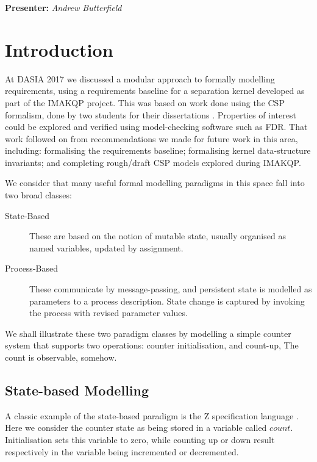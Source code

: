 
\begin{center}
\textbf{Presenter:} \emph{Andrew Butterfield}
\end{center}

\section{Introduction}

At DASIA 2017\cite{Lero-DASIA17}
we discussed a modular approach to formally modelling
requirements, using a requirements baseline for a separation kernel developed
as part of the IMAKQP project\cite{IMAKQP-D02}.
This was based on work done using the CSP formalism\cite{hoare-1985:commuseque:},
done by two students for their dissertations \cite{KH-MCS2016,Costelloe17}.
Properties of interest could be explored and verified using
model-checking software such as FDR\cite{FDR3}.
That work followed on from recommendations we made for future work
in this area, including:
formalising the requirements baseline;
formalising kernel data-structure invariants;
and completing rough/draft CSP models explored during IMAKQP.

We consider that many useful formal modelling paradigms in this space
fall into two broad classes:
\begin{description}
  \item [State-Based]
    These are based on the notion of mutable state,
    usually organised as named variables, updated by assignment.
  \item [Process-Based]
    These communicate by message-passing, and persistent state
    is modelled as parameters to a process description.
    State change is captured by invoking the process with revised parameter values.
\end{description}
We shall illustrate these two paradigm classes by modelling a simple counter
system that supports two operations: counter initialisation, and count-up,
The count is observable, somehow.

\subsection{State-based Modelling}

A classic example of the state-based paradigm is
the Z specification language \cite{UsingZ}.
Here we consider the counter state as being stored
in a variable called $count$. Initialisation sets this variable to zero,
while counting up or down result respectively
in the variable being incremented or decremented.

